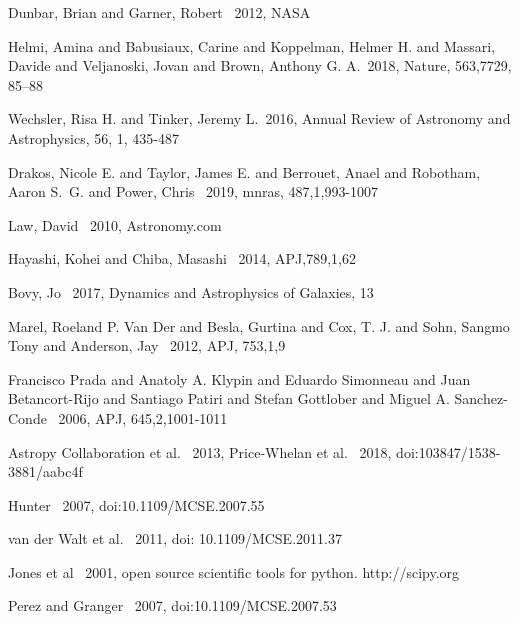 \documentclass{aastex63}
\begin{document}
\begin{thebibliography}{}

 Dunbar, Brian and Garner, Robert \ 2012, NASA

 Helmi, Amina and Babusiaux, Carine and Koppelman, Helmer H. and Massari, Davide and Veljanoski, Jovan and Brown, Anthony G. A.\  2018, Nature, 563,7729, 85–88

 Wechsler, Risa H. and Tinker, Jeremy L.\  2016, Annual Review of Astronomy and Astrophysics, 56, 1, 435-487 

 Drakos, Nicole E. and Taylor, James E. and Berrouet, Anael and Robotham, Aaron S.~G. and Power, Chris \ 2019, mnras, 487,1,993-1007

 Law, David \ 2010, Astronomy.com

 Hayashi, Kohei and Chiba, Masashi \ 2014, APJ,789,1,62

 Bovy, Jo \  2017, Dynamics and Astrophysics of Galaxies, 13

 Marel, Roeland P. Van Der and Besla, Gurtina and Cox, T. J. and Sohn, Sangmo Tony and Anderson, Jay \ 2012, APJ, 753,1,9

 Francisco Prada and Anatoly A. Klypin and Eduardo Simonneau and Juan Betancort-Rijo and Santiago Patiri and Stefan Gottlober and Miguel A. Sanchez-Conde \ 2006, APJ, 645,2,1001-1011

 Astropy Collaboration et al. \ 2013, Price-Whelan et al. \ 2018, doi:103847/1538-3881/aabc4f

 Hunter \ 2007, doi:10.1109/MCSE.2007.55

 van der Walt et al. \ 2011, doi: 10.1109/MCSE.2011.37

 Jones et al \ 2001, open source scientific tools for python. http://scipy.org

 Perez and Granger \ 2007, doi:10.1109/MCSE.2007.53



\end{thebibliography}
\end{document}
